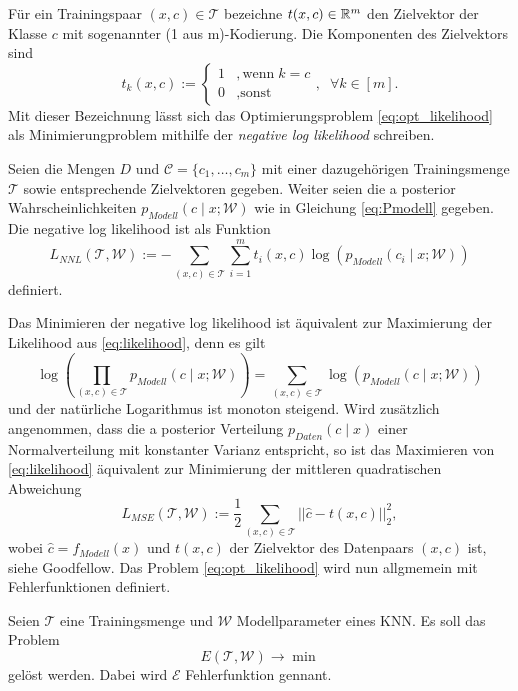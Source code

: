 Für ein Trainingspaar $(x,c) \in \mathcal{T}$ bezeichne $t(x,c) \in \mathbb{R}^m$ den Zielvektor der Klasse $c$ mit sogenannter (1 aus m)-Kodierung. Die Komponenten des Zielvektors sind
\begin{equation*}
    t_k(x,c):= \begin{cases}
        1 &, \text{wenn} \; k=c \\
        0 &, \text{sonst}
    \end{cases}, \; \; \forall k \in [m].
\end{equation*} 
Mit dieser Bezeichnung lässt sich das Optimierungsproblem \ref{eq:opt_likelihood} als Minimierungproblem mithilfe der \textit{negative log likelihood} schreiben.
\begin{defi}
    Seien die Mengen $D$ und  $\mathcal{C}=\{c_1, \ldots, c_m\}$ mit einer dazugehörigen Trainingsmenge $\mathcal{T}$ sowie entsprechende Zielvektoren gegeben. Weiter seien die a posterior Wahrscheinlichkeiten $p_{Modell}(c \; | \; x; \mathcal{W})$ wie in Gleichung \ref{eq:Pmodell} gegeben. Die negative log likelihood ist als Funktion 
    \begin{equation}
        \label{eq:NLL}
        L_{NNL}(\mathcal{T},\mathcal{W}):= -\sum_{(x,c) \in \mathcal{T}}  \sum_{i=1}^m t_i(x,c) \log \left(p_{Modell}(c_i \; | \; x; \mathcal{W}) \right) 
    \end{equation}
    definiert.
\end{defi}

Das Minimieren der negative log likelihood ist äquivalent zur Maximierung der Likelihood aus \ref{eq:likelihood}, denn es gilt 
\begin{equation*}
    \log \left(\prod_{(x,c) \in \mathcal{T}} p_{Modell}(c \; | \; x; \mathcal{W})\right)= \sum_{(x,c) \in \mathcal{T}} \log \left(p_{Modell}(c \; | \; x; \mathcal{W}) \right)
\end{equation*}
und der natürliche Logarithmus ist monoton steigend. Wird zusätzlich angenommen, dass die a posterior Verteilung  $p_{Daten}(c \; | \; x)$ einer Normalverteilung mit konstanter Varianz entspricht, so ist das Maximieren von \ref{eq:likelihood} äquivalent zur Minimierung der mittleren quadratischen Abweichung
\begin{equation*}
    \label{eq:MSE_1}
    L_{MSE}(\mathcal{T},\mathcal{W}):=\frac{1}{2} \sum_{(x,c) \in \mathcal{T}} ||\hat{c}-t(x,c)||_2^2,
\end{equation*}
wobei $\hat{c}=f_{Modell}(x)$ und $t(x,c)$ der Zielvektor des Datenpaars $(x,c)$ ist, siehe Goodfellow\cite{Goodfellow-et-al-2016}. 
Das Problem \ref{eq:opt_likelihood} wird nun allgmemein mit Fehlerfunktionen definiert.
 \begin{defi}[Fehlerfunktion]
    Seien $\mathcal{T}$ eine Trainingsmenge und $\mathcal{W}$ Modellparameter eines KNN. Es soll das Problem
    \begin{equation}
        \label{eq:error_fun_opt}
        E(\mathcal{T},\mathcal{W}) \rightarrow \min
    \end{equation}
    gelöst werden. Dabei wird $\mathcal{E}$ Fehlerfunktion gennant.
 \end{defi}

